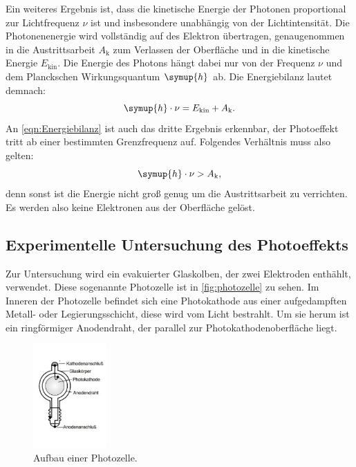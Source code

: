 \noindent
Ein weiteres Ergebnis ist, dass die kinetische Energie der Photonen proportional zur Lichtfrequenz $\nu$ ist und insbesondere unabhängig von der Lichtintensität.
Die Photonenenergie wird vollständig auf des Elektron übertragen, genaugenommen in die Austrittsarbeit $A_\text{k}$ zum Verlassen der Oberfläche und in die kinetische Energie $E_\text{kin}$.
Die Energie des Photons hängt dabei nur von der Frequenz $\nu$ und dem Planckschen Wirkungsquantum $\symup{h}$ ab.
Die Energiebilanz lautet demnach:
\begin{equation}
    \label{eqn:Energiebilanz}
    \symup{h} \cdot \nu = E_\text{kin} + A_\text{k}.
\end{equation}
An \autoref{eqn:Energiebilanz} ist auch das dritte Ergebnis erkennbar, der Photoeffekt tritt ab einer bestimmten Grenzfrequenz auf.
Folgendes Verhältnis muss also gelten:
\begin{equation*}
    \symup{h} \cdot \nu > A_\text{k},
\end{equation*}
denn sonst ist die Energie nicht groß genug um die Austrittsarbeit zu verrichten.
Es werden also keine Elektronen aus der Oberfläche gelöst.

\subsection{Experimentelle Untersuchung des Photoeffekts}
\label{subsec:Experimentelle Untersuchung des Photoeffekts mit der Gegenfeldmethode}

Zur Untersuchung wird ein evakuierter Glaskolben, der zwei Elektroden enthählt, verwendet.
Diese sogenannte Photozelle ist in \autoref{fig:photozelle} zu sehen.
Im Inneren der Photozelle befindet sich eine Photokathode aus einer aufgedampften Metall- oder Legierungsschicht, diese wird vom Licht bestrahlt.
Um sie herum ist ein ringförmiger Anodendraht, der parallel zur Photokathodenoberfläche liegt.

\begin{figure}
    \centering
    \includegraphics[width =0.25\textwidth]{content/photozelle.pdf}
    \caption{Aufbau einer Photozelle.\cite{anleitung}}
    \label{fig:photozelle}
\end{figure}

